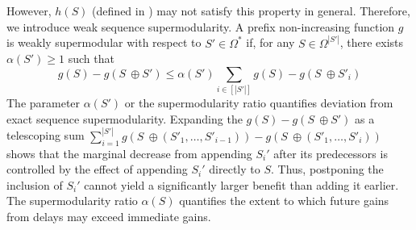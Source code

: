 \documentclass{article}
\begin{document}
However, $h(S)$ (defined in ) may not satisfy this property in general. Therefore, we introduce weak sequence supermodularity. A prefix non-increasing function $g$ is weakly supermodular with respect to $S' \in \Omega^*$ if, for any $S \in \Omega^{|S'|}$, there exists $\alpha(S') \geq 1$ such that
\begin{equation}\label{eqn:alpha_supermod}
     g(S) - g(S\ \oplus S') \leq \alpha(S') \sum_{i \in [|S'|]} g(S) - g(S \ \oplus S'_i)
\end{equation}
The parameter $\alpha(S')$ or the supermodularity ratio quantifies deviation from exact sequence supermodularity.
Expanding the $g(S) - g(S\ \oplus S')$ as a telescoping sum 
$\sum_{i = 1}^{|S'|} g(S \ \oplus \left(S'_1, \dots, S'_{i - 1}\right)) - g(S \ \oplus \left(S'_1, \dots, S'_{i}\right))$
shows that the marginal decrease from appending $S_i'$ after its predecessors
is controlled by the effect of appending $S_i'$ directly to $S$. Thus, postponing the inclusion of $S_i'$ cannot yield a significantly larger benefit than adding it earlier. The supermodularity ratio $\alpha(S)$ quantifies the extent to which future gains from delays may exceed immediate gains. 

\end{document}
